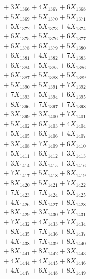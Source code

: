 \documentclass[a4paper,10pt]{article}
\begin{document}
{\begin{align}
&\;  + 3 X_{1366} + 4 X_{1367} + 6 X_{1368} \\[0.3ex]
&\;  + 5 X_{1369} + 5 X_{1370} + 5 X_{1371} \\[0.3ex]
&\;  + 5 X_{1372} + 5 X_{1373} + 4 X_{1374} \\[0.3ex]
&\;  + 6 X_{1375} + 5 X_{1376} + 6 X_{1377} \\[0.3ex]
&\;  + 6 X_{1378} + 6 X_{1379} + 5 X_{1380} \\[0.3ex]
&\;  + 6 X_{1381} + 4 X_{1382} + 7 X_{1383} \\[0.3ex]
&\;  + 6 X_{1384} + 5 X_{1385} + 6 X_{1386} \\[0.3ex]
&\;  + 6 X_{1387} + 5 X_{1388} + 5 X_{1389} \\[0.5ex]\allowbreak
&\;  + 5 X_{1390} + 5 X_{1391} + 7 X_{1392} \\[0.3ex]
&\;  + 7 X_{1393} + 5 X_{1394} + 6 X_{1395} \\[0.3ex]
&\;  + 8 X_{1396} + 7 X_{1397} + 7 X_{1398} \\[0.3ex]
&\;  + 3 X_{1399} + 3 X_{1400} + 7 X_{1401} \\[0.3ex]
&\;  + 5 X_{1402} + 6 X_{1403} + 4 X_{1404} \\[0.3ex]
&\;  + 5 X_{1405} + 6 X_{1406} + 4 X_{1407} \\[0.3ex]
&\;  + 3 X_{1408} + 7 X_{1409} + 6 X_{1410} \\[0.3ex]
&\;  + 5 X_{1411} + 6 X_{1412} + 3 X_{1413} \\[0.3ex]
&\;  + 3 X_{1414} + 3 X_{1415} + 3 X_{1416} \\[0.3ex]
&\;  + 7 X_{1417} + 5 X_{1418} + 8 X_{1419} \\[0.5ex]\allowbreak
&\;  + 8 X_{1420} + 5 X_{1421} + 7 X_{1422} \\[0.3ex]
&\;  + 7 X_{1423} + 7 X_{1424} + 5 X_{1425} \\[0.3ex]
&\;  + 4 X_{1426} + 8 X_{1427} + 8 X_{1428} \\[0.3ex]
&\;  + 8 X_{1429} + 3 X_{1430} + 7 X_{1431} \\[0.3ex]
&\;  + 7 X_{1432} + 4 X_{1433} + 7 X_{1434} \\[0.3ex]
&\;  + 8 X_{1435} + 7 X_{1436} + 8 X_{1437} \\[0.3ex]
&\;  + 4 X_{1438} + 7 X_{1439} + 8 X_{1440} \\[0.3ex]
&\;  + 8 X_{1441} + 8 X_{1442} + 3 X_{1443} \\[0.3ex]
&\;  + 4 X_{1444} + 4 X_{1445} + 8 X_{1446} \\[0.3ex]
&\;  + 4 X_{1447} + 6 X_{1448} + 8 X_{1449} \\[0.5ex]\allowbreak

\end{align}}
\end{document}
